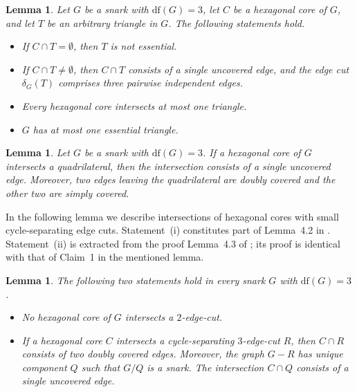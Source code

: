 \documentclass[a4paper]{amsart}
\newcommand{\df}[1]{\ensuremath{\mathrm{df}({#1})}\xspace}
\theoremstyle{plain}
\newtheorem{lemma}[theorem]{Lemma}
\theoremstyle{definition}
\begin{document}
\begin{lemma}\label{lem:essential}\cite[Lemma~4.1]{KMNS-defred}
Let $G$ be a snark with $\df{G}=3$, let $C$ be a hexagonal core
of $G$, and let $T$ be an arbitrary triangle in $G$. The
following statements hold.
\begin{itemize}
\item[{\rm (i)}] If $C\cap T=\emptyset$, then $T$ is not
    essential.

\item[{\rm (ii)}]  If $C\cap T\ne\emptyset$, then $C\cap T$
    consists of a single uncovered edge, and the edge cut
    $\delta_G(T)$ comprises three pairwise independent edges.

\item[{\rm (iii)}] Every hexagonal core intersects at most
    one triangle.

\item[{\rm (iv)}] $G$ has at most one essential triangle.
 \end{itemize}
\end{lemma}

\begin{lemma}\label{lem:core_quadrangle}\cite[Lemma
4.5]{KMNS-defred}
Let $G$ be a snark with $\df{G}=3$. If a hexagonal core of $G$
intersects a quadrilateral, then the intersection consists of a
single uncovered edge. Moreover, two edges leaving the
quadrilateral are doubly covered and the other two are simply
covered.
\end{lemma}

In the following lemma we describe intersections of hexagonal
cores with small cycle-separating edge cuts. Statement~(i)
constitutes part of Lemma~4.2 in \cite{KMNS-defred}.
Statement~(ii) is extracted from the proof Lemma~4.3 of
\cite{KMNS-defred}; its proof is identical with that of Claim~1
in the mentioned lemma.

\begin{lemma}\label{lem:2+3-cuts}
The following two statements hold in every snark $G$ with
$\df{G}=3$.
\begin{itemize}
\item[{\rm (i)}] No hexagonal core of $G$ intersects a
    $2$-edge-cut.
\item[{\rm (ii)}] If a hexagonal core $C$ intersects a
    cycle-separating $3$-edge-cut $R$, then $C\cap R$
    consists of two doubly covered edges. Moreover, the
    graph $G-R$ has unique component $Q$ such that $G/Q$ is
    a snark. The intersection $C\cap Q$ consists of a
    single uncovered edge.
\end{itemize}
\end{lemma}
\end{document}
